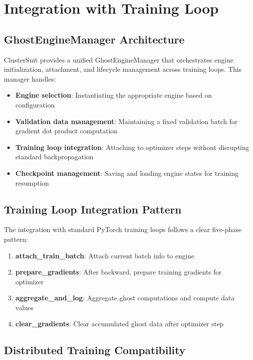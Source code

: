 \documentclass[12pt,a4paper]{report}
\begin{document}
\section{Integration with Training Loop}
\label{sec:training_integration}

\subsection{GhostEngineManager Architecture}
\label{sec:engine_manager}

ClusterSuit provides a unified GhostEngineManager that orchestrates engine initialization, attachment, and lifecycle management across training loops. This manager handles:

\begin{itemize}
    \item \textbf{Engine selection}: Instantiating the appropriate engine based on configuration
    \item \textbf{Validation data management}: Maintaining a fixed validation batch for gradient dot product computation
    \item \textbf{Training loop integration}: Attaching to optimizer steps without disrupting standard backpropagation
    \item \textbf{Checkpoint management}: Saving and loading engine states for training resumption
\end{itemize}

\subsection{Training Loop Integration Pattern}
\label{sec:loop_pattern}

The integration with standard PyTorch training loops follows a clear five-phase pattern:

\begin{enumerate}
    \item \textbf{attach\_train\_batch}: Attach current batch info to engine
    \item \textbf{prepare\_gradients}: After backward, prepare training gradients for optimizer
    \item \textbf{aggregate\_and\_log}: Aggregate ghost computations and compute data values
    \item \textbf{clear\_gradients}: Clear accumulated ghost data after optimizer step
\end{enumerate}

\subsection{Distributed Training Compatibility}
\label{sec:distributed}
\end{document}
